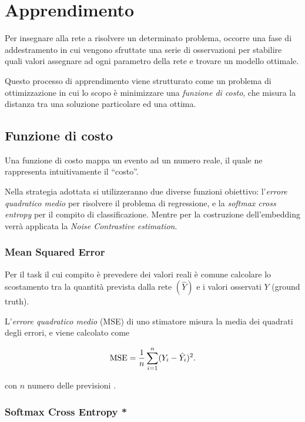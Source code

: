 \section{Apprendimento}
\label{sec:apprendimento}
Per insegnare alla rete a risolvere un determinato problema, occorre una fase di addestramento in cui vengono sfruttate una serie di osservazioni per stabilire quali valori assegnare ad ogni parametro della rete e trovare un modello ottimale.

Questo processo di apprendimento viene strutturato come un problema di ottimizzazione in cui lo scopo è minimizzare una \emph{funzione di costo}, che misura la distanza tra una soluzione particolare ed una ottima. 

\subsection{Funzione di costo}
\label{subsec:loss}

Una funzione di costo mappa un evento ad un numero reale, il quale ne rappresenta intuitivamente il ``costo''.

Nella strategia adottata si utilizzeranno due diverse funzioni obiettivo: l'\emph{errore quadratico medio} per risolvere il problema di regressione, e la \emph{softmax cross entropy} per il compito di classificazione. Mentre per la costruzione dell'embedding verrà applicata la \emph{Noise Contrastive estimation}.

\subsubsection{Mean Squared Error}
\label{subsubsec:MSE}

Per il task il cui compito è prevedere dei valori reali è comune calcolare lo scostamento tra la quantità prevista dalla rete $(\hat{Y})$ e i valori osservati $Y$ (ground truth). 
 
L'\emph{errore quadratico medio} (MSE) di uno stimatore misura la media dei quadrati degli errori, e viene calcolato come

\begin{equation}
\operatorname{MSE} = \frac{1}{n}\sum_{i=1}^{n}(Y_i-\hat{Y}_i)^2 \mbox{.}
\end{equation}

con $n$ numero delle previsioni \cite{wang2009mean}.

\subsubsection{Softmax Cross Entropy *}
\label{subsubsec:sce}

